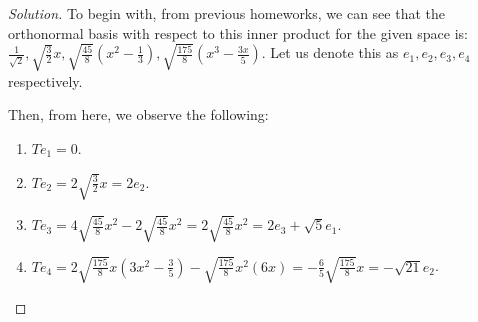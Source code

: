 \documentclass{article}
\newenvironment{solution}{\begin{proof}[Solution]}{\end{proof}}
\begin{document}
\begin{solution}
\begin{comment}
	
	Then, using the fact that the matrix representation of $T^{*}$ is the conjugate transpose of $T$, we have:
	\begin{equation*}
		\mathcal{M}(T) = \begin{bmatrix}
			0 & 0 & 0 & 0 \\
			0 & 2 & 0 & 0 \\
			0 & 0 & 2 & 0 \\
			0 & 0 & 0 & 0
		\end{bmatrix}
	\end{equation*}

	We observe then that:
	\begin{equation*}
		\mathcal{M}(T^{*}T) = \begin{bmatrix}
			0 & 0 & 0 & 0 \\
			0 & 4 & 0 & 0 \\
			0 & 0 & 4 & 0 \\
			0 & 0 & 0 & 0
		\end{bmatrix}
	\end{equation*}

	From here, we note that we have the following for each of the eigenvalues:
	\begin{enumerate}
		\item For $\lambda = 0$, we see that the associated eigenvectors are $1, x^{3}$ (as seen from previous calculations).
		\item For $\lambda = 4$, we see that the associated eigenvectors are $2x, 2x^{2}$ (since we know that $T(x) = 2x$, then $T(2x) = 2T(x) = 4x$, and a similar process is used for $x^{2}$).
	\end{enumerate}

	Thus, we observe that $\dim(4, T^{*}T) = 2$ and $\dim(0, T^{*}T) = 2$. Therefore, we have then that the singular values of $T$ are $2,2,0,0$. 
	\end{comment}
	To begin with, from previous homeworks, we can see that the orthonormal basis with respect to this inner product for the given space is: $\frac{1}{\sqrt{2}}, \sqrt{\frac{3}{2}}x, \sqrt{\frac{45}{8}}\left( x^{2} - \frac{1}{3} \right), \sqrt{\frac{175}{8}}\left( x^{3} - \frac{3x}{5} \right)$. Let us denote this as $e_{1}, e_{2}, e_{3}, e_{4}$ respectively.
	
	Then, from here, we observe the following:
	\begin{enumerate}
		\item $Te_{1} = 0$.
		\item $Te_{2} = 2\sqrt{\frac{3}{2}}x = 2e_{2}$.
		\item $Te_{3} = 4\sqrt{\frac{45}{8}}x^{2} - 2\sqrt{\frac{45}{8}}x^{2} = 2\sqrt{\frac{45}{8}}x^{2} = 2e_{3} + \sqrt{5}e_{1}$.
		\item $Te_{4} = 2\sqrt{\frac{175}{8}}x(3x^{2} - \frac{3}{5}) - \sqrt{\frac{175}{8}}x^{2}(6x) = -\frac{6}{5}\sqrt{\frac{175}{8}}x = -\sqrt{21}e_{2}$.
	\end{enumerate}
	

\end{solution}
\end{document}
